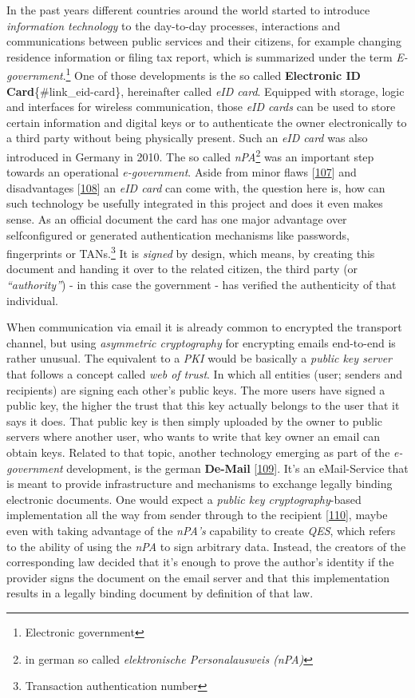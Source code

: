\documentclass[12pt,english,a4paper,titlepage,cleardoublepage=empty,dottedtoc]{report}
\begin{document}
In the past years different countries around the world started to
introduce \emph{information technology} to the day-to-day processes,
interactions and communications between public services and their
citizens, for example changing residence information or filing tax
report, which is summarized under the term
\emph{E-government}.\footnote{Electronic government} One of those
developments is the so called \textbf{Electronic ID
Card}\{\#link\_eid-card\}, hereinafter called \emph{eID card}. Equipped
with storage, logic and interfaces for wireless communication, those
\emph{eID cards} can be used to store certain information and digital
keys or to authenticate the owner electronically to a third party
without being physically present. Such an \emph{eID card} was also
introduced in Germany in 2010. The so called \emph{nPA}\footnote{in
  german so called \emph{elektronische Personalausweis (nPA)}} was an
important step towards an operational \emph{e-government}. Aside from
minor flaws
{[}\protect\hyperlink{ref-web_2013_npa-sicherheitsdefizit}{107}{]} and
disadvantages
{[}\protect\hyperlink{ref-web_2014_test-qes-support-in-npa}{108}{]} an
\emph{eID card} can come with, the question here is, how can such
technology be usefully integrated in this project and does it even makes
sense. As an official document the card has one major advantage over
selfconfigured or generated authentication mechanisms like passwords,
fingerprints or TANs.\footnote{Transaction authentication number} It is
\emph{signed} by design, which means, by creating this document and
handing it over to the related citizen, the third party (or
\emph{``authority''}) - in this case the government - has verified the
authenticity of that individual.

When communication via email it is already common to encrypted the
transport channel, but using \emph{asymmetric cryptography} for
encrypting emails end-to-end is rather unusual. The equivalent to a
\emph{PKI} would be basically a \emph{public key server} that follows a
concept called \emph{web of trust}. In which all entities (user; senders
and recipients) are signing each other's public keys. The more users
have signed a public key, the higher the trust that this key actually
belongs to the user that it says it does. That public key is then simply
uploaded by the owner to public servers where another user, who wants to
write that key owner an email can obtain keys. Related to that topic,
another technology emerging as part of the \emph{e-government}
development, is the german \textbf{De-Mail}
{[}\protect\hyperlink{ref-web_2017_about-de-mail}{109}{]}. It's an
eMail-Service that is meant to provide infrastructure and mechanisms to
exchange legally binding electronic documents. One would expect a
\emph{public key cryptography}-based implementation all the way from
sender through to the recipient
{[}\protect\hyperlink{ref-statement_2013_de-mail}{110}{]}, maybe even
with taking advantage of the \emph{nPA's} capability to create
\emph{QES}, which refers to the ability of using the \emph{nPA} to sign
arbitrary data. Instead, the creators of the corresponding law decided
that it's enough to prove the author's identity if the provider signs
the document on the email server and that this implementation results in
a legally binding document by definition of that law.
\end{document}
